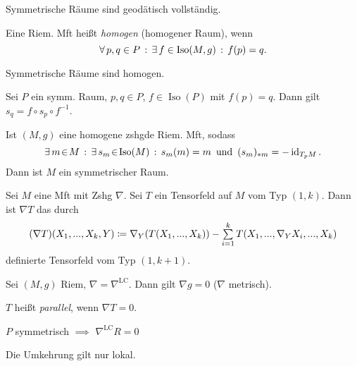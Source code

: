 \documentclass{cheat-sheet}
\DeclareMathOperator{\Iso}{Iso} %
\newcommand{\LC}{\nabla^{\mathrm{LC}}} %
\begin{document}
\begin{kor}
  Symmetrische Räume sind geodätisch vollständig.
\end{kor}

\begin{defn}
  Eine Riem. Mft heißt \emph{homogen} (homogener Raum), wenn
  \[ \fa{p, q \in P} \ex{f \in \Iso(M, g)} f(p) = q. \]
\end{defn}

\begin{lem}
  Symmetrische Räume sind homogen.
\end{lem}

\begin{lem}
  Sei $P$ ein symm. Raum, $p, q \in P$, $f \in \Iso(P)$ mit $f(p) = q$. Dann gilt $s_q = f \circ s_p \circ f^{-1}$.
\end{lem}

\begin{kor}
  Ist $(M, g)$ eine homogene zshgde Riem. Mft, sodass
  \[
    \ex{m \!\in\! M} \ex{s_m \!\in\! \Iso(M)} s_m(m) = m
    \enspace \text{und} \enspace
    (s_m)_{*m} = - \id_{T_p M}.
  \]
  Dann ist $M$ ein symmetrischer Raum.
\end{kor}

\begin{defn}
  Sei $M$ eine Mft mit Zshg $\nabla$. Sei $T$ ein Tensorfeld auf $M$ vom Typ $(1,k)$. Dann ist $\nabla T$ das durch
  \[
    (\nabla T)(X_1, \nldots, X_k, Y) \coloneqq \nabla_Y(T(X_1, \nldots, X_k)) - \sum_{i=1}^k T(X_1, \nldots, \nabla_Y X_i, \nldots, X_k)
  \]
  definierte Tensorfeld vom Typ $(1, k+1)$.
\end{defn}

\begin{bsp}
  Sei $(M, g)$ Riem, $\nabla = \LC$. Dann gilt $\nabla g = 0$ ($\nabla$ metrisch).
\end{bsp}

\begin{defn}
  $T$ heißt \emph{parallel}, wenn $\nabla T = 0$.
\end{defn}

\begin{satz}
  $P$ symmetrisch $\implies$ $\LC R = 0$
\end{satz}

\begin{bem}
  Die Umkehrung gilt nur lokal.
\end{bem}


\end{document}

